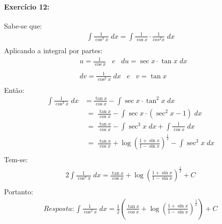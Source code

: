 \documentclass[12pt]{article}
\begin{document}
\paragraph{Exercício 12:}
Sabe-se que:
\begin{align*}
\int \frac{1}{\cos ^{3}x}\;dx = \int \frac{1}{\cos x}\cdot \frac{1}{cos^{2}x}\;dx\\
\end{align*}
Aplicando a integral por partes:
\begin{align*}
&u =\frac{1}{\cos x} \;\;\;e\;\;\; du = \sec x \cdot \tan x\;dx\\ \\
&dv = \frac{1}{\cos ^{2}x}\;dx \;\;\;e\;\;\; v=\tan x\\
\end{align*}
Então:
\begin{align*}
\int \frac{1}{\cos ^{3}x}\;dx &= \frac{\tan x}{\cos x}-\int \sec x \cdot \tan^{2}x\;dx\\
&\;=\;\frac{\tan x}{\cos x}-\int \sec x \cdot \left ( \sec ^{2}x -1 \right )\;dx\\
&\;=\;\frac{\tan x}{\cos x}-\int \sec^{3} x\;dx +\int \frac{1}{\cos x}\;dx\\
&\;=\;\frac{\tan x}{\cos x}+\log \left (\frac{1+\sin x}{1-\sin x}  \right )^{\frac{1}{2}} - \int \sec ^{3}x\;dx\\
\end{align*}
Tem-se:
\begin{align*}
2\int \frac{1}{\cos ^{3}x}\;dx = \frac{\tan x}{\cos x} + \log \left ( \frac{1+\sin x}{1-\sin x} \right )^{\frac{1}{2}}+C\\
\end{align*}
Portanto:
\begin{align*}
Resposta: \int \frac{1}{\cos ^{3}x}\;dx = \frac{1}{2}\left (\frac{\tan x}{\cos x} + \log \left ( \frac{1+\sin x}{1-\sin x} \right )^{\frac{1}{2}}  \right ) + C\\
\end{align*}

\end{document}
